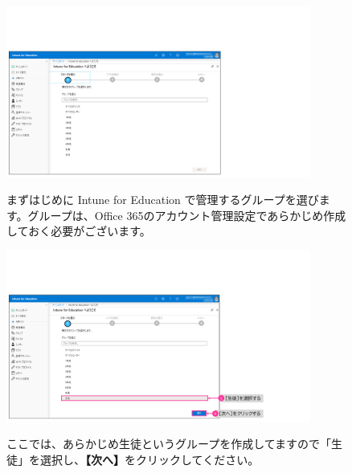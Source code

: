 \begin{figure}[h]
    \begin{minipage}{0.6\textwidth}
        \vspace{-1cm}
        \includegraphics[width=10cm]{figures/Setup-Intune-04.png}
    \end{minipage}
    \begin{minipage}{0.4\textwidth}
        まずはじめに Intune for Education で管理するグループを選びます。グループは、Office 365のアカウント管理設定であらかじめ作成しておく必要がございます。
    \end{minipage}
\end{figure}

\begin{figure}[h]
    \begin{minipage}{0.6\textwidth}
        \vspace{-1cm}
        \includegraphics[width=10cm]{figures/Setup-Intune-05.png}
    \end{minipage}
    \begin{minipage}{0.4\textwidth}
        ここでは、あらかじめ生徒というグループを作成してますので「生徒」を選択し、\textbf{【次へ】}をクリックしてください。
    \end{minipage}
\end{figure}

